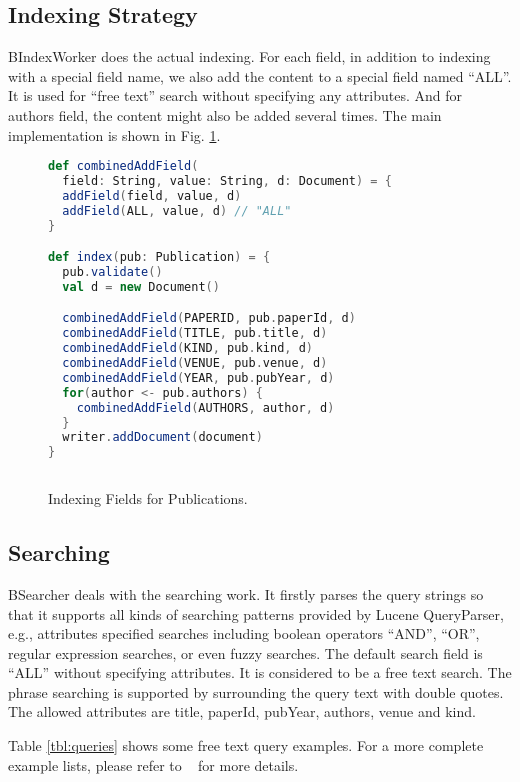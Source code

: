 \subsection{Indexing Strategy}
\textsf{BIndexWorker} does the actual indexing. For each field, in addition to indexing with a special field name, we also add the content to a special field named ``ALL''. It is used for ``free text'' search without specifying any attributes. And for \textsf{authors} field, the content might also be added several times. The main implementation is shown in Fig. \ref{fig:indexing}.

\begin{figure}[t]
\begin{lstlisting}[language=scala]
def combinedAddField(
  field: String, value: String, d: Document) = {
  addField(field, value, d)
  addField(ALL, value, d) // "ALL"
}

def index(pub: Publication) = {
  pub.validate()
  val d = new Document()

  combinedAddField(PAPERID, pub.paperId, d)
  combinedAddField(TITLE, pub.title, d)
  combinedAddField(KIND, pub.kind, d)
  combinedAddField(VENUE, pub.venue, d)
  combinedAddField(YEAR, pub.pubYear, d)
  for(author <- pub.authors) {
    combinedAddField(AUTHORS, author, d)
  }
  writer.addDocument(document)
}
	
\end{lstlisting}
\caption{Indexing Fields for Publications.}\label{fig:indexing}
\end{figure}

\subsection{Searching}
\textsf{BSearcher} deals with the searching work. It firstly parses the query strings so that it supports all kinds of searching patterns provided by Lucene \textsf{QueryParser}, e.g., attributes specified searches including boolean operators ``AND'', ``OR'', regular expression searches, or even fuzzy searches. The default search field is ``ALL'' without specifying attributes. It is considered to be a free text search. The phrase searching is supported by surrounding the query text with double quotes. The allowed attributes are \textsf{title}, \textsf{paperId}, \textsf{pubYear}, \textsf{authors}, \textsf{venue} and \textsf{kind}.

Table \ref{tbl:queries} shows some free text query examples. For a more complete example lists, please refer to ~\cite{doc_lucene_parser} for more details.


